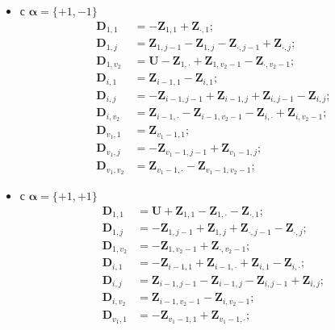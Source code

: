 \begin{multicols}{2}
\begin{itemize}
\item с $\boldsymbol{\alpha} = \{+1,-1\}$ 
  \begin{align*}
  \boldsymbol{D}_{1,1} & = -\boldsymbol{Z}_{1,1} + \boldsymbol{Z}_{\cdot,1};\\
  \boldsymbol{D}_{1,j} & = \boldsymbol{Z}_{1,j-1} - \boldsymbol{Z}_{1,j} - \boldsymbol{Z}_{\cdot,j-1} + 
\boldsymbol{Z}_{\cdot,j};\\
  \boldsymbol{D}_{1,v_2} & = \boldsymbol{U}- \boldsymbol{Z}_{1,\cdot} + \boldsymbol{Z}_{1,v_2-1} - \boldsymbol{Z}_{\cdot,v_2-1};\\
  \boldsymbol{D}_{i,1} & = \boldsymbol{Z}_{i-1,1} - \boldsymbol{Z}_{i,1};\\
  \boldsymbol{D}_{i,j} & = -\boldsymbol{Z}_{i-1,j-1} + \boldsymbol{Z}_{i-1,j} + \boldsymbol{Z}_{i,j-1} - \boldsymbol{Z}_{i,j};\\
  \boldsymbol{D}_{i,v_2} & = \boldsymbol{Z}_{i-1,\cdot} - \boldsymbol{Z}_{i-1,v_2-1} - \boldsymbol{Z}_{i,\cdot} + 
\boldsymbol{Z}_{i,v_2-1};\\
  \boldsymbol{D}_{v_1,1} & = \boldsymbol{Z}_{v_1-1,1};\\
  \boldsymbol{D}_{v_1,j} & = -\boldsymbol{Z}_{v_1-1,j-1} + \boldsymbol{Z}_{v_1-1,j};\\
  \boldsymbol{D}_{v_1,v_2} & = \boldsymbol{Z}_{v_1-1,\cdot} - \boldsymbol{Z}_{v_1-1,v_2-1};
  \end{align*}
  
\item  с $\boldsymbol{\alpha} = \{+1,+1\}$
  \begin{align*}
  \boldsymbol{D}_{1,1} & = \boldsymbol{U} + \boldsymbol{Z}_{1,1} - \boldsymbol{Z}_{1,\cdot} - \boldsymbol{Z}_{\cdot,1}; \\
  \boldsymbol{D}_{1,j}& = -\boldsymbol{Z}_{1,j-1} + \boldsymbol{Z}_{1,j} + \boldsymbol{Z}_{\cdot,j-1 } - 
\boldsymbol{Z}_{\cdot,j}; \\
  \boldsymbol{D}_{1,v_2} & = -\boldsymbol{Z}_{1,v_2-1} + \boldsymbol{Z}_{\cdot,v_2-1}; \\
  \boldsymbol{D}_{i,1} & = -\boldsymbol{Z}_{i-1,1} + \boldsymbol{Z}_{i-1,\cdot} + \boldsymbol{Z}_{i,1} - \boldsymbol{Z}_{i,\cdot};\\
     \boldsymbol{D}_{i,j} & = \boldsymbol{Z}_{i-1,j-1} - \boldsymbol{Z}_{i-1,j} - \boldsymbol{Z}_{i,j-1} + \boldsymbol{Z}_{i,j}; \\
       \boldsymbol{D}_{i,v_2} & = \boldsymbol{Z}_{i-1,v_2-1} - \boldsymbol{Z}_{i,v_2-1};\\
         \boldsymbol{D}_{v_1,1}& = -\boldsymbol{Z}_{v_1-1,1} + \boldsymbol{Z}_{v_1-1,\cdot};
  \end{align*}
  

\end{itemize}
\end{multicols}
